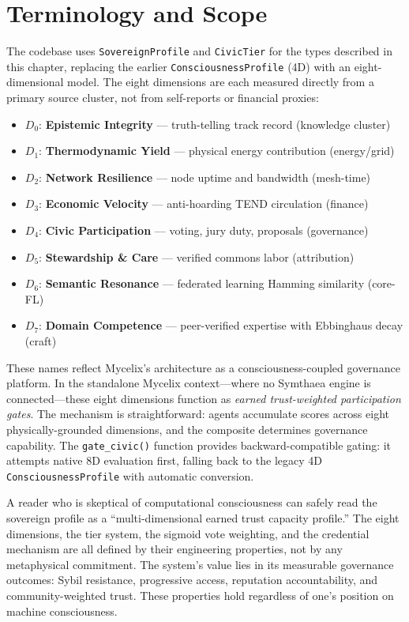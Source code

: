 \documentclass[12pt]{book}
\begin{document}
\section{Terminology and Scope}

The codebase uses \texttt{SovereignProfile} and \texttt{CivicTier} for the types described in this chapter, replacing the earlier \texttt{ConsciousnessProfile} (4D) with an eight-dimensional model. The eight dimensions are each measured directly from a primary source cluster, not from self-reports or financial proxies:

\begin{itemize}[nosep]
  \item $D_0$: \textbf{Epistemic Integrity} --- truth-telling track record (knowledge cluster)
  \item $D_1$: \textbf{Thermodynamic Yield} --- physical energy contribution (energy/grid)
  \item $D_2$: \textbf{Network Resilience} --- node uptime and bandwidth (mesh-time)
  \item $D_3$: \textbf{Economic Velocity} --- anti-hoarding TEND circulation (finance)
  \item $D_4$: \textbf{Civic Participation} --- voting, jury duty, proposals (governance)
  \item $D_5$: \textbf{Stewardship \& Care} --- verified commons labor (attribution)
  \item $D_6$: \textbf{Semantic Resonance} --- federated learning Hamming similarity (core-FL)
  \item $D_7$: \textbf{Domain Competence} --- peer-verified expertise with Ebbinghaus decay (craft)
\end{itemize}

These names reflect Mycelix's architecture as a consciousness-coupled governance platform. In the standalone Mycelix context---where no Symthaea engine is connected---these eight dimensions function as \emph{earned trust-weighted participation gates}. The mechanism is straightforward: agents accumulate scores across eight physically-grounded dimensions, and the composite determines governance capability. The \texttt{gate\_civic()} function provides backward-compatible gating: it attempts native 8D evaluation first, falling back to the legacy 4D \texttt{ConsciousnessProfile} with automatic conversion.

A reader who is skeptical of computational consciousness can safely read the sovereign profile as a ``multi-dimensional earned trust capacity profile.'' The eight dimensions, the tier system, the sigmoid vote weighting, and the credential mechanism are all defined by their engineering properties, not by any metaphysical commitment. The system's value lies in its measurable governance outcomes: Sybil resistance, progressive access, reputation accountability, and community-weighted trust. These properties hold regardless of one's position on machine consciousness.
\end{document}
